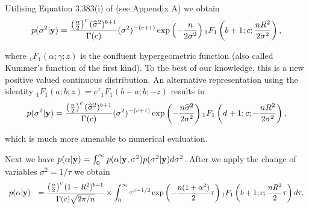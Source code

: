 \noindent 
Utilising Equation 3.383(i) of \cite{Gradshteyn2007} (see Appendix A) we obtain  
$$
\displaystyle p(\sigma^2|{\bf y}) 
\displaystyle = 
\frac{\left(\tfrac{n}{2}\right)^c (\widehat{\sigma}^2)^{b+1}}{\Gamma(c)} (\sigma^2)^{-(c+1)} \exp\left(  - \frac{n}{2\sigma^2} \right)
{}_1 F_1\left(b + 1; c; \frac{nR^2}{2\sigma^2} \right),
$$

\noindent where 
${}_1 F_1(\alpha;\gamma;z)$ 
is the confluent hypergeometric function (also called
Kummer's function of the first kind).
To the best of our knowledge, this is a new positive valued continuous distribution.
An alternative representation using the identity ${}_1F_1(a;b;z) = e^z {}_1F_1(b-a;b;-z)$ results in
$$
\displaystyle p(\sigma^2|{\bf y}) 
\displaystyle = 
\frac{\left(\tfrac{n}{2}\right)^c (\widehat{\sigma}^2)^{b+1}}{\Gamma(c)} (\sigma^2)^{-(c+1)} \exp\left(  - \frac{n \widehat{\sigma}^2}{2\sigma^2} \right)
{}_1 F_1\left( d + 1; c; -\frac{nR^2}{2\sigma^2} \right),
$$

\noindent which is much more amenable to numerical evaluation. 
 
 
Next we have
$p(\alpha|{\bf y}) = \int_0^\infty p(\alpha|{\bf y},\sigma^2)p(\sigma^2|{\bf y}) d\sigma^2$.
After we apply the change of variables $\sigma^2 = 1/\tau$
we obtain
$$
\begin{array}{rl}
\displaystyle p(\alpha|{\bf y}) 
& \displaystyle = \frac{\left(\tfrac{n}{2}\right)^c (1 -  R^2)^{b+1}  }{\Gamma(c)\sqrt{2\pi/n}} 
\times 
\int_0^\infty 
\tau^{c - 1/2} \exp\left( -\frac{n(1+\alpha^2)}{2} \tau \right)   {}_1 F_1\left( b + 1; c; \frac{nR^2}{2} \tau \right) d \tau.
\end{array}
$$


